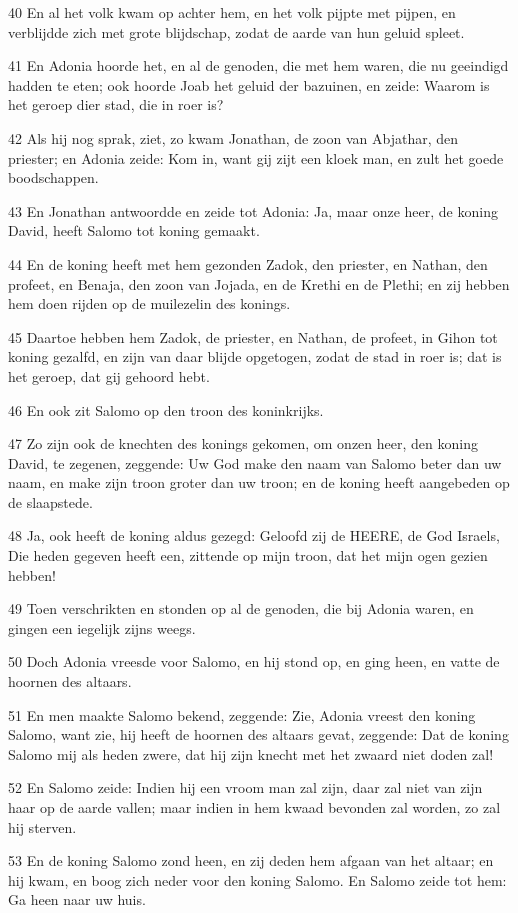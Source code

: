 \par 40 En al het volk kwam op achter hem, en het volk pijpte met pijpen, en verblijdde zich met grote blijdschap, zodat de aarde van hun geluid spleet.
\par 41 En Adonia hoorde het, en al de genoden, die met hem waren, die nu geeindigd hadden te eten; ook hoorde Joab het geluid der bazuinen, en zeide: Waarom is het geroep dier stad, die in roer is?
\par 42 Als hij nog sprak, ziet, zo kwam Jonathan, de zoon van Abjathar, den priester; en Adonia zeide: Kom in, want gij zijt een kloek man, en zult het goede boodschappen.
\par 43 En Jonathan antwoordde en zeide tot Adonia: Ja, maar onze heer, de koning David, heeft Salomo tot koning gemaakt.
\par 44 En de koning heeft met hem gezonden Zadok, den priester, en Nathan, den profeet, en Benaja, den zoon van Jojada, en de Krethi en de Plethi; en zij hebben hem doen rijden op de muilezelin des konings.
\par 45 Daartoe hebben hem Zadok, de priester, en Nathan, de profeet, in Gihon tot koning gezalfd, en zijn van daar blijde opgetogen, zodat de stad in roer is; dat is het geroep, dat gij gehoord hebt.
\par 46 En ook zit Salomo op den troon des koninkrijks.
\par 47 Zo zijn ook de knechten des konings gekomen, om onzen heer, den koning David, te zegenen, zeggende: Uw God make den naam van Salomo beter dan uw naam, en make zijn troon groter dan uw troon; en de koning heeft aangebeden op de slaapstede.
\par 48 Ja, ook heeft de koning aldus gezegd: Geloofd zij de HEERE, de God Israels, Die heden gegeven heeft een, zittende op mijn troon, dat het mijn ogen gezien hebben!
\par 49 Toen verschrikten en stonden op al de genoden, die bij Adonia waren, en gingen een iegelijk zijns weegs.
\par 50 Doch Adonia vreesde voor Salomo, en hij stond op, en ging heen, en vatte de hoornen des altaars.
\par 51 En men maakte Salomo bekend, zeggende: Zie, Adonia vreest den koning Salomo, want zie, hij heeft de hoornen des altaars gevat, zeggende: Dat de koning Salomo mij als heden zwere, dat hij zijn knecht met het zwaard niet doden zal!
\par 52 En Salomo zeide: Indien hij een vroom man zal zijn, daar zal niet van zijn haar op de aarde vallen; maar indien in hem kwaad bevonden zal worden, zo zal hij sterven.
\par 53 En de koning Salomo zond heen, en zij deden hem afgaan van het altaar; en hij kwam, en boog zich neder voor den koning Salomo. En Salomo zeide tot hem: Ga heen naar uw huis.

